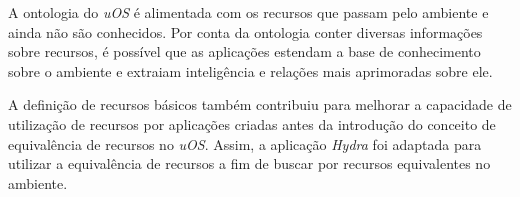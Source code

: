 A ontologia do \emph{uOS} é alimentada com os recursos que passam pelo ambiente e ainda não são conhecidos. Por conta da ontologia conter diversas informações sobre recursos, é possível que as aplicações estendam a base de conhecimento sobre o ambiente e extraiam inteligência e relações mais aprimoradas sobre ele.

A definição de recursos básicos também contribuiu para melhorar a capacidade de utilização de recursos por aplicações criadas antes da introdução do conceito de equivalência de recursos no \emph{uOS}. Assim, a aplicação \emph{Hydra} foi adaptada para utilizar a equivalência de recursos a fim de buscar por recursos equivalentes no ambiente.

